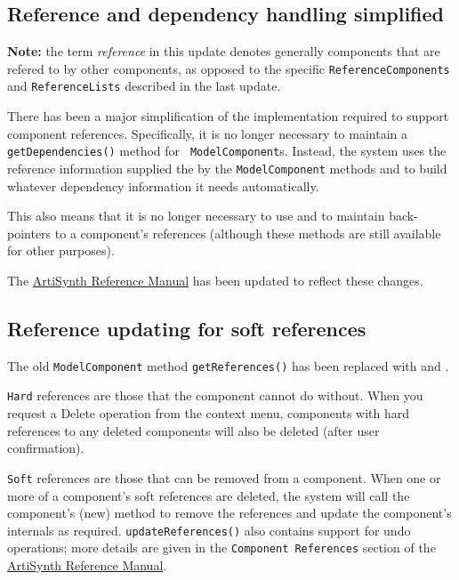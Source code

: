 \documentclass{article}
\begin{document}
\subsection*{Reference and dependency handling simplified}

\begin{sideblock}
{\bf Note:} the term {\it reference} in this update denotes generally
components that are refered to by other components, as opposed to the
specific {\tt ReferenceComponents} and {\tt ReferenceLists} described
in the last update.
\end{sideblock}

There has been a major simplification of the implementation
required to support component references. Specifically, it is no
longer necessary to maintain a {\tt getDependencies()} method for {\tt
ModelComponent}s. Instead, the system uses the reference information
supplied the by the {\tt ModelComponent} methods
and
to build whatever dependency information it needs automatically.

This also means that it is no longer necessary to use
and
to maintain back-pointers to a component's references (although these
methods are still available for other purposes).

The \href{http://www.artisynth.org/doc/html/artisynth/artisynth.html}%
{ArtiSynth Reference Manual} has been updated to reflect these
changes.

\subsection*{Reference updating for soft references}

The old {\tt ModelComponent} method {\tt getReferences()} has been
replaced with
and
.

{\tt Hard} references are those that the component cannot do without.
When you request a {\sf Delete} operation from the context menu,
components with hard references to any deleted components will also be
deleted (after user confirmation).

{\tt Soft} references are those that can be removed from a component.
When one or more of a component's soft references are deleted, the
system will call the component's (new)
method to remove the references and update the component's internals
as required. {\tt updateReferences()} also contains support for undo
operations; more details are given in the {\tt Component References}
section of the 
\href{http://www.artisynth.org/doc/html/artisynth/artisynth.html}%
{ArtiSynth Reference Manual}.
\end{document}
